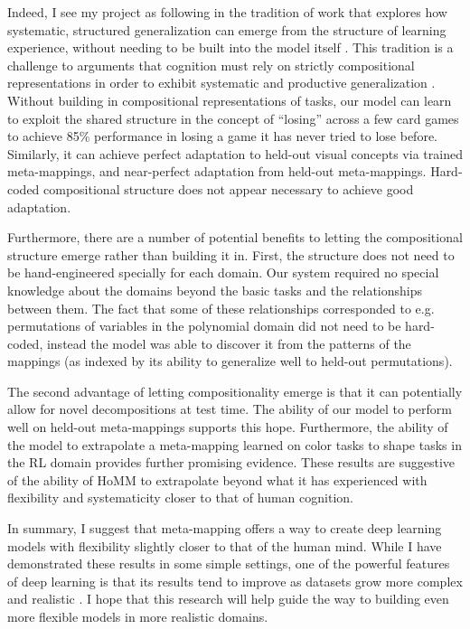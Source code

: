 Indeed, I see my project as following in the tradition of work that explores how systematic, structured generalization can emerge from the structure of learning experience, without needing to be built into the model itself \citep{McClelland2010a, McClelland2010, Hansen2017}. This tradition is a challenge to arguments that cognition must rely on strictly compositional representations in order to exhibit systematic and productive generalization \citep[e.g.][]{Fodor2001, Fodor2008lot2, Lake2017}. Without building in compositional representations of tasks, our model can learn to exploit the shared structure in the concept of ``losing'' across a few card games to achieve 85\% performance in losing a game it has never tried to lose before. Similarly, it can achieve perfect adaptation to held-out visual concepts via trained meta-mappings, and near-perfect adaptation from held-out meta-mappings. Hard-coded compositional structure does not appear necessary to achieve good adaptation. \par 

Furthermore, there are a number of potential benefits to letting the compositional structure emerge rather than building it in. First, the structure does not need to be hand-engineered specially for each domain. Our system required no special knowledge about the domains beyond the basic tasks and the relationships between them. The fact that some of these relationships corresponded to e.g. permutations of variables in the polynomial domain did not need to be hard-coded, instead the model was able to discover it from the patterns of the mappings (as indexed by its ability to generalize well to held-out permutations). \par

The second advantage of letting compositionality emerge is that it can potentially allow for novel decompositions at test time. The ability of our model to perform well on held-out meta-mappings supports this hope. Furthermore, the ability of the model to extrapolate a meta-mapping learned on color tasks to shape tasks in the RL domain provides further promising evidence. These results are suggestive of the ability of HoMM to extrapolate beyond what it has experienced with flexibility and systematicity closer to that of human cognition.\par

In summary, I suggest that meta-mapping offers a way to create deep learning models with flexibility slightly closer to that of the human mind. While I have demonstrated these results in some simple settings, one of the powerful features of deep learning is that its results tend to improve as datasets grow more complex and realistic \citep{Hill2019a,Radford2019,Sutton2019}. I hope that this research will help guide the way to building even more flexible models in more realistic domains. \par

